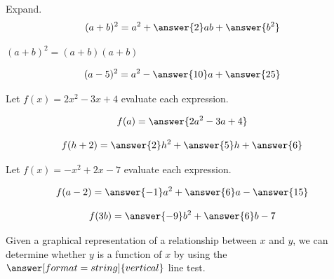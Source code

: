 \documentclass{ximera}
\begin{document}
\begin{problem}\label{prob:160hom1prob9}
Expand.
$$(a+b)^2=a^2+\answer{2}ab+\answer{b^2}$$
\begin{hint}
$(a+b)^2=(a+b)(a+b)$
\end{hint}
$$(a-5)^2=a^2-\answer{10}a
+\answer{25}$$
\end{problem}

\begin{problem}\label{prob:160hom1prob6}
Let $f(x)=2x^2-3x+4$ evaluate each expression.

$$f(a)=\answer{2a^2-3a+4}$$

$$f(h+2)=\answer{2}h^2+\answer{5}h+\answer{6}$$
\end{problem}

\begin{problem}\label{prob:160hom1prob7}
Let $f(x)=-x^2+2x-7$ evaluate each expression.

$$f(a-2)=\answer{-1}a^2+\answer{6}a-\answer{15}$$

$$f(3b)=\answer{-9}b^2+\answer{6}b-7$$
\end{problem}

\begin{problem}\label{prob:160hom1prob8}
Given a graphical representation of a relationship between $x$ and $y$, we can determine whether $y$ is a function of $x$ by using the $\answer[format=string]{vertical}$ line test.
\end{problem}
\end{document}
